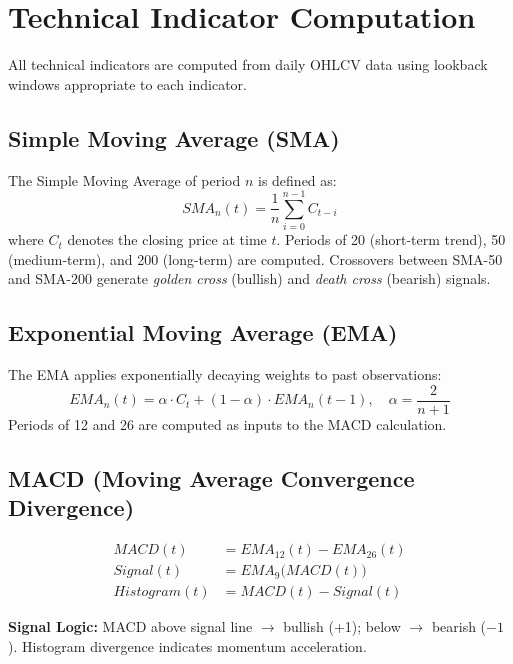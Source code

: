\documentclass[12pt, a4paper, oneside]{report}
\begin{document}
\section{Technical Indicator Computation}
\label{sec:meth_technical}

All technical indicators are computed from daily OHLCV data using lookback windows appropriate to each indicator.

\subsection{Simple Moving Average (SMA)}

The Simple Moving Average of period $n$ is defined as:
\begin{equation}
    SMA_n(t) = \frac{1}{n} \sum_{i=0}^{n-1} C_{t-i}
\end{equation}
where $C_t$ denotes the closing price at time $t$. Periods of 20 (short-term trend), 50 (medium-term), and 200 (long-term) are computed. Crossovers between SMA-50 and SMA-200 generate \textit{golden cross} (bullish) and \textit{death cross} (bearish) signals.

\subsection{Exponential Moving Average (EMA)}

The EMA applies exponentially decaying weights to past observations:
\begin{equation}
    EMA_n(t) = \alpha \cdot C_t + (1 - \alpha) \cdot EMA_n(t-1), \quad \alpha = \frac{2}{n+1}
\end{equation}
Periods of 12 and 26 are computed as inputs to the MACD calculation.

\subsection{MACD (Moving Average Convergence Divergence)}

\begin{align}
    MACD(t) &= EMA_{12}(t) - EMA_{26}(t) \\
    Signal(t) &= EMA_9\big(MACD(t)\big) \\
    Histogram(t) &= MACD(t) - Signal(t)
\end{align}

\textbf{Signal Logic:} MACD above signal line $\to$ bullish (+1); below $\to$ bearish ($-1$). Histogram divergence indicates momentum acceleration.
\end{document}
